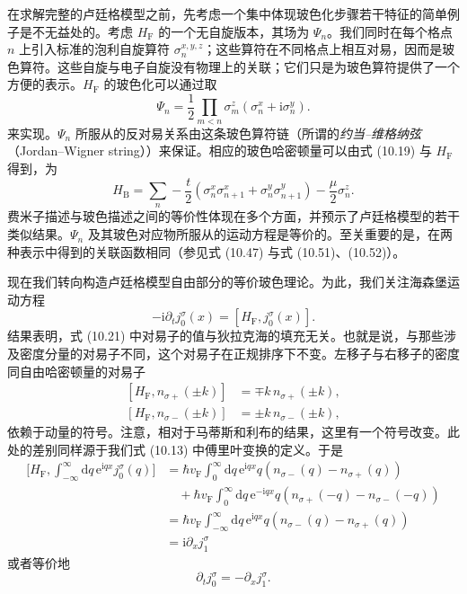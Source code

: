 在求解完整的卢廷格模型之前，先考虑一个集中体现玻色化步骤若干特征的简单例子是不无益处的。考虑 $H_{\mathrm{F}}$ 的一个无自旋版本，其场为 $\Psi_{n}$。我们同时在每个格点 $n$ 上引入标准的泡利自旋算符 $\sigma_{n}^{x,y,z}$；这些算符在不同格点上相互对易，因而是玻色算符。这些自旋与电子自旋没有物理上的关联；它们只是为玻色算符提供了一个方便的表示。$H_{\mathrm{F}}$ 的玻色化可以通过取
\begin{equation*}
\Psi_{n}=\frac{1}{2}\prod_{m<n}\sigma_{m}^{z}\left(\sigma_{n}^{x}+\mathrm{i}\sigma_{n}^{y}\right).
\tag{10.19}
\end{equation*}
来实现。$\Psi_{n}$ 所服从的反对易关系由这条玻色算符链（所谓的\emph{约当–维格纳弦}（Jordan–Wigner string））来保证。相应的玻色哈密顿量可以由式 (10.19) 与 $H_{\mathrm{F}}$ 得到，为
\begin{equation*}
H_{\mathrm{B}}=\sum_{n}-\frac{t}{2}\left(\sigma_{n}^{x}\sigma_{n+1}^{x}+\sigma_{n}^{y}\sigma_{n+1}^{y}\right)-\frac{\mu}{2}\sigma_{n}^{z}.
\tag{10.20}
\end{equation*}
费米子描述与玻色描述之间的等价性体现在多个方面，并预示了卢廷格模型的若干类似结果。$\Psi_{n}$ 及其玻色对应物所服从的运动方程是等价的。至关重要的是，在两种表示中得到的关联函数相同（参见式 (10.47) 与式 (10.51)、(10.52)）。

现在我们转向构造卢廷格模型自由部分的等价玻色理论。为此，我们关注海森堡运动方程
\begin{equation*}
-\mathrm{i}\partial_{t}j_{0}^{\sigma}(x)=\left[H_{\mathrm{F}},j_{0}^{\sigma}(x)\right].
\tag{10.21}
\end{equation*}
结果表明，式 (10.21) 中对易子的值与狄拉克海的填充无关。也就是说，与那些涉及密度分量的对易子不同，这个对易子在正规排序下不变。左移子与右移子的密度同自由哈密顿量的对易子
\begin{align*}
\left[H_{\mathrm{F}},n_{\sigma+}(\pm k)\right]&=\mp k\,n_{\sigma+}(\pm k),\\
\left[H_{\mathrm{F}},n_{\sigma-}(\pm k)\right]&=\pm k\,n_{\sigma-}(\pm k),
\tag{10.22}
\end{align*}
依赖于动量的符号。注意，相对于马蒂斯和利布的结果，这里有一个符号改变。此处的差别同样源于我们式 (10.13) 中傅里叶变换的定义。于是
\begin{align*}
\biggl[H_{\mathrm{F}},\int_{-\infty}^{\infty}\mathrm{d}q\,\mathrm{e}^{\mathrm{i}qx}j_{0}^{\sigma}(q)\biggr]&=\hbar v_{\mathrm{F}}\int_{0}^{\infty}\mathrm{d}q\,\mathrm{e}^{\mathrm{i}qx}q\left(n_{\sigma-}(q)-n_{\sigma+}(q)\right)\\
&\quad+\hbar v_{\mathrm{F}}\int_{0}^{\infty}\mathrm{d}q\,\mathrm{e}^{-\mathrm{i}qx}q\left(n_{\sigma+}(-q)-n_{\sigma-}(-q)\right)\\
&=\hbar v_{\mathrm{F}}\int_{-\infty}^{\infty}\mathrm{d}q\,\mathrm{e}^{\mathrm{i}qx}q\left(n_{\sigma-}(q)-n_{\sigma+}(q)\right)\\
&=\mathrm{i}\partial_{x}j_{1}^{\sigma}
\tag{10.23}
\end{align*}
或者等价地
\begin{equation*}
\partial_{t}j_{0}^{\sigma}=-\partial_{x}j_{1}^{\sigma}.
\tag{10.24}
\end{equation*}

